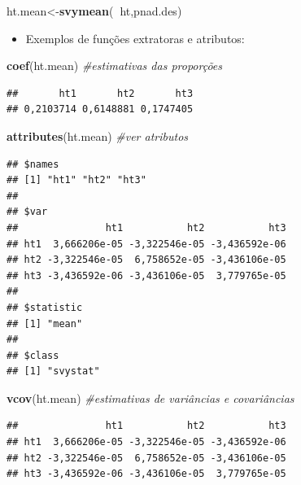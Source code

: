 \documentclass[]{book}
\newenvironment{Shaded}{\begin{snugshade}}{\end{snugshade}}
\newcommand{\KeywordTok}[1]{\textcolor[rgb]{0.13,0.29,0.53}{\textbf{#1}}}
\newcommand{\CommentTok}[1]{\textcolor[rgb]{0.56,0.35,0.01}{\textit{#1}}}
\newcommand{\OperatorTok}[1]{\textcolor[rgb]{0.81,0.36,0.00}{\textbf{#1}}}
\newcommand{\NormalTok}[1]{#1}
\providecommand{\tightlist}{%
  \setlength{\itemsep}{0pt}\setlength{\parskip}{0pt}}
\theoremstyle{definition}
\theoremstyle{definition}
\theoremstyle{definition}
\theoremstyle{remark}
\begin{document}
\begin{Shaded}
\begin{Highlighting}[]
\NormalTok{ht.mean<-}\KeywordTok{svymean}\NormalTok{(}\OperatorTok{~}\NormalTok{ht,pnad.des)}
\end{Highlighting}
\end{Shaded}

\begin{itemize}
\tightlist
\item
  Exemplos de funções extratoras e atributos:
\end{itemize}

\begin{Shaded}
\begin{Highlighting}[]
\KeywordTok{coef}\NormalTok{(ht.mean)                         }\CommentTok{#estimativas das proporções}
\end{Highlighting}
\end{Shaded}

\begin{verbatim}
##       ht1       ht2       ht3 
## 0,2103714 0,6148881 0,1747405
\end{verbatim}

\begin{Shaded}
\begin{Highlighting}[]
\KeywordTok{attributes}\NormalTok{(ht.mean)                          }\CommentTok{#ver atributos}
\end{Highlighting}
\end{Shaded}

\begin{verbatim}
## $names
## [1] "ht1" "ht2" "ht3"
## 
## $var
##               ht1           ht2           ht3
## ht1  3,666206e-05 -3,322546e-05 -3,436592e-06
## ht2 -3,322546e-05  6,758652e-05 -3,436106e-05
## ht3 -3,436592e-06 -3,436106e-05  3,779765e-05
## 
## $statistic
## [1] "mean"
## 
## $class
## [1] "svystat"
\end{verbatim}

\begin{Shaded}
\begin{Highlighting}[]
\KeywordTok{vcov}\NormalTok{(ht.mean)                         }\CommentTok{#estimativas de variâncias e covariâncias}
\end{Highlighting}
\end{Shaded}

\begin{verbatim}
##               ht1           ht2           ht3
## ht1  3,666206e-05 -3,322546e-05 -3,436592e-06
## ht2 -3,322546e-05  6,758652e-05 -3,436106e-05
## ht3 -3,436592e-06 -3,436106e-05  3,779765e-05
\end{verbatim}
\end{document}
